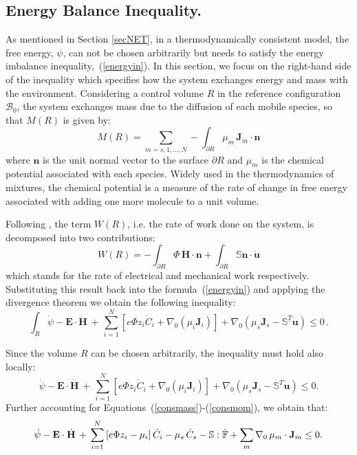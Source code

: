 \subsection{Energy Balance Inequality.}
\label{sec_ine}

As mentioned in Section \ref{secNET}, in a thermodynamically consistent model, the free energy, $\psi$, can not be chosen arbitrarily but needs to satisfy the energy imbalance inequality,~(\ref{energyin}). In this section, we focus on the right-hand side of the inequality which specifies how the system exchanges energy and mass with the environment. Considering a control volume $R$ in the reference configuration $\mathcal{B}_0$, the system exchanges mass due to the diffusion of each mobile species, so that $M(R)$ is given by:
\begin{equation}
M(R)= \sum\limits_{m=s,1,\ldots,N} - \int_{\partial R} \mu_m \,\mathbf{J}_m \cdot \mathbf{n} 
\end{equation}
where $\mathbf{n}$ is the unit normal vector to the surface $\partial R$ and $\mu_m$ is the chemical potential associated with each species. Widely used in the thermodynamics of mixtures, the chemical potential is a measure of the rate of change in free energy associated with adding one more molecule to a unit volume.

Following \cite{DROZDOVph}, the term $W(R)$, i.e. the rate of work done on the system, is decomposed into two contributions:
\begin{equation}
W(R) = -\int_{\partial R} \Phi\, \dot{\mathbf{H}}\cdot \mathbf{n} +  \int_{\partial R}\mathbb{S}\mathbf{n} \cdot \dot{\mathbf{u}}
\end{equation}
which stands for the rate of electrical and mechanical work respectively. Substituting this result back into the formula~(\ref{energyin}) and applying the divergence theorem we obtain the following inequality:
\begin{equation}
\int_R \dot{\psi} - \mathbf{E}\cdot \dot{\mathbf{H}} \, + \, \sum\limits_{i=1}^{N} \left[e \Phi  z_i \dot{C}_i+ \nabla_0 \left(\mu_i \mathbf{J}_i \right)\right] + \nabla_0 (\mu_s \mathbf{J}_s-\mathbb{S}^T\mathbf{\dot{u}}) \leq 0\,. 
\end{equation}

Since the volume $R$ can be chosen arbitrarily, the inequality must hold also locally:
\begin{equation}
\dot{\psi} - \mathbf{E}\cdot \dot{\mathbf{H}} \, + \, \sum\limits_{i=1}^{N} \left[e \Phi  z_i \dot{C}_i+ \nabla_0 \left(\mu_i \mathbf{J}_i \right)\right] + \nabla_0 (\mu_s \mathbf{J}_s -\mathbb{S}^T\mathbf{\dot{u}}) \leq 0. 
\end{equation}
Further accounting for Equations~(\ref{consmass})-(\ref{consmom}), we obtain that:
\begin{equation}
\begin{aligned}
\dot{\psi} - \mathbf{E}\cdot \dot{\mathbf{H}} \, + \, \sum\limits_{i=1}^{N} \left[e \Phi  z_i - \mu_i\right] \dot{C}_i - \mu_s \,\dot{C}_s -\mathbb{S}:\dot{\mathbb{F}}+ \sum\limits_{m} \nabla_0 \, \mu_m \cdot \mathbf{J}_m \leq 0.
\label{temp2}
\end{aligned} 
\end{equation}

